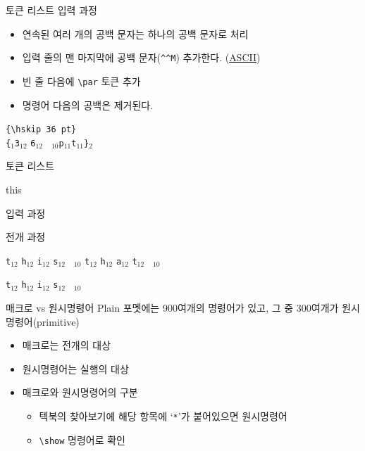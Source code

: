 \documentclass{beamer}
\begin{document}
%
\begin{frame}[fragile]{토큰 리스트}
  \alert{입력 과정}

  \begin{itemize}
  \item 연속된 여러 개의 공백 문자는 하나의 공백 문자로 처리
  \item 입력 줄의 맨 마지막에 공백 문자(\verb+^^M+) 추가한다.
    (\href{http://www.asciitable.com}{ASCII})
  \item 빈 줄 다음에 \verb+\par+ 토큰 추가
  \item 명령어 다음의 공백은 제거된다.
  \end{itemize}
  
  \verb*+{\hskip 36 pt}+\\
  \bigskip
  \verb|{|$_1$\quad{}\quad\verb|3|$_{12}$
  \quad\verb|6|$_{12}$\quad
  \verb*| |$_{10}$\quad\verb|p|$_{11}$\quad\verb|t|$_{11}$\quad\verb|}|$_{2}$
\end{frame}


%
\begin{frame}[fragile]{토큰 리스트}
\begin{verbatim*}
\def\tokentwo{\iftrue this \else that \fi}
\tokentwo
\end{verbatim*}
    \bigskip
    \alert{입력 과정}
    
    
    \bigskip
    \alert{전개 과정}
    
    \quad
    \verb|t|$_{12}$\quad
    \verb|h|$_{12}$\quad
    \verb|i|$_{12}$\quad
    \verb|s|$_{12}$\quad
    \verb*| |$_{10}$\quad
    \quad
    \verb|t|$_{12}$\quad
    \verb|h|$_{12}$\quad
    \verb|a|$_{12}$\quad
    \verb|t|$_{12}$\quad
    \verb*| |$_{10}$\quad

    \bigskip
    \verb|t|$_{12}$\quad
    \verb|h|$_{12}$\quad
    \verb|i|$_{12}$\quad
    \verb|s|$_{12}$\quad
    \verb*| |$_{10}$\quad
\end{frame}


%
\begin{frame}[fragile]{매크로 vs 원시명령어}
  Plain 포멧에는 900여개의 명령어가 있고, 그 중 300여개가 원시명령어(primitive)
  \begin{itemize}
  \item 매크로는 \alert{전개}의 대상
  \item 원시명령어는 \alert{실행}의 대상
  \item 매크로와 원시명령어의 구분
    \begin{itemize}
    \item 텍북의 찾아보기에 해당 항목에 `\verb+*+'가 붙어있으면 원시명령어
    \item \verb+\show+ 명령어로 확인
    \end{itemize}
  \end{itemize}
\end{frame}
\end{document}
